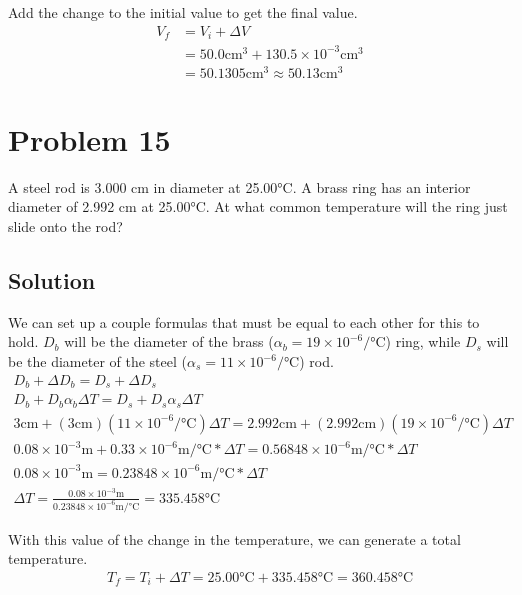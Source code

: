 \documentclass[12pt]{article}
\begin{document}
            Add the change to the initial value to get the final value.
            \begin{align}
                V_f &=  V_i + \Delta V\\
                    &=  50.0 \unit{\centi\meter^3} + 130.5 \times 10^{-3} \unit{\centi\meter^3}\\
                    &=  50.1305 \unit{\centi\meter^3} \approx \boxed{50.13 \unit{\centi\meter^3}}
            \end{align}


    \pagebreak
    \section{Problem 15}
        A steel rod is 3.000 cm in diameter at 25.00°C. A brass ring has an interior diameter of 2.992 cm at 25.00°C. At what common temperature will the ring just slide onto the rod?

        \subsection{Solution}
        We can set up a couple formulas that must be equal to each other for this to hold. 
        $D_b$ will be the diameter of the brass ($\alpha_b = 19 \times 10^{-6}/\unit{\celsius}$) ring, while $D_s$ will be the diameter of the steel ($\alpha_s = 11 \times 10^{-6}/\unit{\celsius}$) rod. 
        \begin{gather}
            D_b + \Delta D_b = D_s + \Delta D_s\\
            D_b + D_b \alpha_b \Delta T = D_s + D_s \alpha_s \Delta T\\
            3 \unit{\centi\meter} + (3 \unit{\centi\meter}) (11 \times 10^{-6}/\unit{\celsius}) \Delta T = 2.992 \unit{\centi\meter} + (2.992 \unit{\centi\meter}) (19 \times 10^{-6}/\unit{\celsius}) \Delta T\\
            0.08 \times 10^{-3} \unit{\meter} + 0.33 \times 10^{-6} \unit{\meter/\celsius} * \Delta T = 0.56848 \times 10^{-6} \unit{\meter/\celsius} * \Delta T\\
            0.08 \times 10^{-3} \unit{\meter} = 0.23848 \times 10^{-6} \unit{\meter/\celsius} * \Delta T\\
            \Delta T = \frac{0.08 \times 10^{-3} \unit{\meter}}{0.23848 \times 10^{-6} \unit{\meter/\celsius}} = 335.458 \unit{\celsius}
        \end{gather}

        With this value of the change in the temperature, we can generate a total temperature.
        \begin{gather}
            T_f =   T_i + \Delta T  
                =   25.00 \unit{\celsius} + 335.458 \unit{\celsius}
                =   \boxed{360.458 \unit{\celsius}}
        \end{gather}
            
\end{document}
